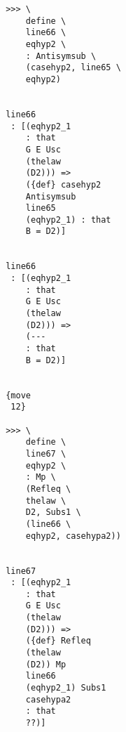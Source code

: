\documentclass[12pt]{article}
\begin{document}
\begin{verbatim}
                                       >>> \
                                           define \
                                           line66 \
                                           eqhyp2 \
                                           : Antisymsub \
                                           (casehyp2, line65 \
                                           eqhyp2)


                                       line66 
                                        : [(eqhyp2_1 
                                           : that 
                                           G E Usc 
                                           (thelaw 
                                           (D2))) => 
                                           ({def} casehyp2 
                                           Antisymsub 
                                           line65 
                                           (eqhyp2_1) : that 
                                           B = D2)]


                                       line66 
                                        : [(eqhyp2_1 
                                           : that 
                                           G E Usc 
                                           (thelaw 
                                           (D2))) => 
                                           (--- 
                                           : that 
                                           B = D2)]


                                       {move 
                                        12}

                                       >>> \
                                           define \
                                           line67 \
                                           eqhyp2 \
                                           : Mp \
                                           (Refleq \
                                           thelaw \
                                           D2, Subs1 \
                                           (line66 \
                                           eqhyp2, casehypa2))


                                       line67 
                                        : [(eqhyp2_1 
                                           : that 
                                           G E Usc 
                                           (thelaw 
                                           (D2))) => 
                                           ({def} Refleq 
                                           (thelaw 
                                           (D2)) Mp 
                                           line66 
                                           (eqhyp2_1) Subs1 
                                           casehypa2 
                                           : that 
                                           ??)]



\end{verbatim}
\end{document}
